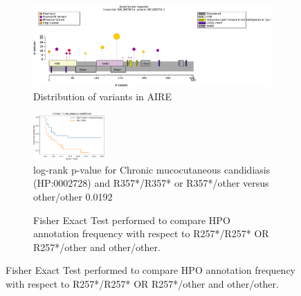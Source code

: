 \begin{figure}[htbp]
\centering
\begin{subfigure}[b]{0.95\textwidth}
\centering
\includegraphics[width=\textwidth]{ img/AIRE_protein_diagram.pdf} 
\captionsetup{justification=raggedright,singlelinecheck=false}
\caption{Distribution of variants in AIRE}
\end{subfigure}

\vspace{2em}

\begin{subfigure}[b]{0.95\textwidth}
\centering
\includegraphics[width=0.3\textwidth]{ img/AIRE_cmc.pdf} 
\captionsetup{justification=raggedright,singlelinecheck=false}
\caption{log-rank p-value for Chronic mucocutaneous candidiasis (HP:0002728) and R357*/R357* or R357*/other versus other/other 0.0192}
\end{subfigure}
    
\vspace{2em}

\begin{subfigure}[b]{0.95\textwidth}
\centering
{}
\captionsetup{justification=raggedright,singlelinecheck=false}
\caption{Fisher Exact Test performed to compare HPO annotation frequency with respect to R257*/R257* OR R257*/other and other/other. }
\end{subfigure}


\end{figure}
